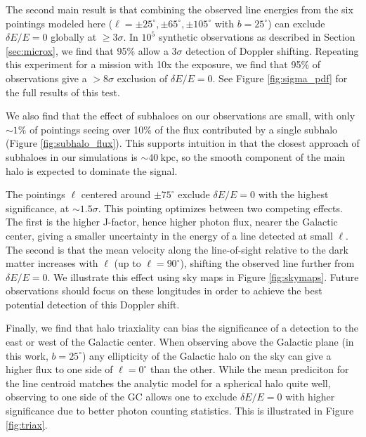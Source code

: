 \documentclass[aps,prd,10pt,twocolumn,superscriptaddress,showpacs]{revtex4-1}
\newcommand{\units}[1]{~\mathrm{#1}}
\begin{document}
The second main result is that combining the observed line energies from the six pointings modeled
here ($\ell=\pm25^\circ,\pm65^\circ,\pm105^\circ$ with $b=25^\circ$) can exclude
$\delta E/E = 0$ globally at $\geq 3\sigma$. In $10^5$ synthetic observations as described in
Section \ref{sec:microx}, we find that 95\% allow a $3\sigma$ detection of Doppler shifting. Repeating this
experiment for a mission with 10x the exposure, we find that 95\% of observations give a $>8\sigma$
exclusion of $\delta E/E = 0$. See Figure \ref{fig:sigma_pdf} for the full results of this test.

We also find that the effect of subhaloes on our observations are small,
with only $\sim1\%$ of pointings seeing over 10\% of the flux contributed by a single subhalo
(Figure \ref{fig:subhalo_flux}). This supports intuition in that the closest approach of subhaloes in our
simulations is $\sim40\units{kpc}$, so the smooth component of the main halo is expected to dominate
the signal.

The pointings $\ell$ centered around $\pm75^\circ$ exclude $\delta E/E=0$ with 
the highest significance, at $\sim 1.5\sigma$.  This pointing optimizes between two
competing effects. The first is the higher J-factor, hence higher
photon flux, nearer the Galactic center, giving a smaller uncertainty in the energy of a line
detected at small $\ell$. The second is that the mean velocity along the line-of-sight relative to
the dark matter increases with $\ell$ (up to $\ell=90^\circ$), shifting the observed line further
from $\delta E/E=0$. We illustrate this effect using sky maps in Figure \ref{fig:skymaps}.
Future observations should focus on these longitudes
in order to achieve the best potential detection of this Doppler shift.

Finally, we find that halo triaxiality can bias the significance of a detection to
the east or west of the Galactic center. When observing above the Galactic plane (in this work,
$b=25^\circ$) any ellipticity of the Galactic halo on the sky can give a higher flux to one side of
$\ell=0^\circ$ than the other. While the mean prediciton for the line centroid matches the analytic model
for a spherical halo quite well, observing to one side of the GC allows one to exclude $\delta
E/E=0$ with higher significance due to better photon counting statistics. This is illustrated in
Figure \ref{fig:triax}. 
\end{document}
